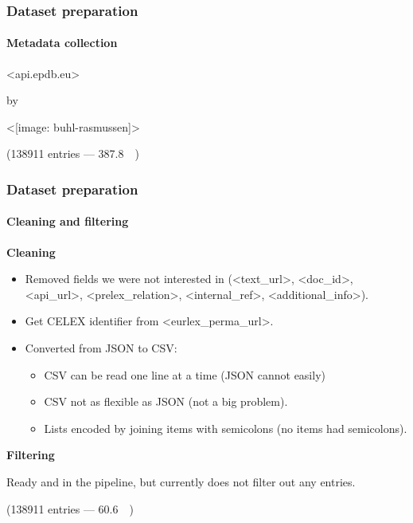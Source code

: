 \documentclass[table]{beamer}
\def\texttt#1{<#1>}
\begin{document}
\begin{frame}
\frametitle{Dataset preparation}
\framesubtitle{Metadata collection}

\centering

{\LARGE \texttt{api.epdb.eu}}

\vspace{5mm}

by

\vspace{5mm}

\texttt{[image: buhl-rasmussen]}

\vspace{10mm}

(\SI{138911}{} entries --- \SI{387.8}{\mega\byte})

\end{frame}

\begin{frame}
\frametitle{Dataset preparation}
\framesubtitle{Cleaning and filtering}

\textbf{Cleaning}

\begin{itemize}
    \item Removed fields we were not interested in (\texttt{text\_url}, \texttt{doc\_id}, \texttt{api\_url}, \texttt{prelex\_relation}, \texttt{internal\_ref}, \texttt{additional\_info}).
    \item Get CELEX identifier from \texttt{eurlex\_perma\_url}.
    \item Converted from JSON to CSV:
    \begin{itemize}
        \item CSV can be read one line at a time (JSON cannot easily)
        \item CSV not as flexible as JSON (not a big problem).
        \item Lists encoded by joining items with semicolons (no items had semicolons).
    \end{itemize}
\end{itemize}

\textbf{Filtering}

Ready and in the pipeline, but currently does not filter out any entries.

\vspace{4mm}

\begin{center}
(\SI{138911}{} entries --- \SI{60.6}{\mega\byte})
\end{center}

\end{frame}
\end{document}
